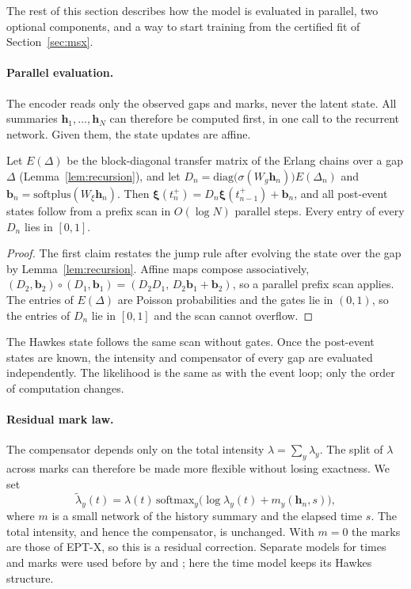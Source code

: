 The rest of this section describes how the model is evaluated in parallel, two optional
components, and a way to start training from the certified fit of Section~\ref{sec:msx}.

\paragraph{Parallel evaluation.} The encoder reads only the observed gaps and marks, never the
latent state. All summaries $\bm h_1,\dots,\bm h_N$ can therefore be computed first, in one call to
the recurrent network. Given them, the state updates are affine.

\begin{lemma}\label{lem:scan}
Let $E(\Delta)$ be the block-diagonal transfer matrix of the Erlang chains over a gap $\Delta$
(Lemma~\ref{lem:recursion}), and let $D_n=\mathrm{diag}\bigl(\sigma(W_g\bm h_n)\bigr)E(\Delta_n)$ and
$\bm b_n=\mathrm{softplus}(W_\xi\bm h_n)$. Then $\bm\xi(t_n^+)=D_n\bm\xi(t_{n-1}^+)+\bm b_n$, and all
post-event states follow from a prefix scan in $O(\log N)$ parallel steps. Every entry of every
$D_n$ lies in $[0,1]$.
\end{lemma}

\begin{proof}
The first claim restates the jump rule after evolving the state over the gap by Lemma~\ref{lem:recursion}.
Affine maps compose associatively, $(D_2,\bm b_2)\circ(D_1,\bm b_1)=(D_2D_1,\,D_2\bm b_1+\bm b_2)$,
so a parallel prefix scan applies. The entries of $E(\Delta)$ are Poisson probabilities and the gates
lie in $(0,1)$, so the entries of $D_n$ lie in $[0,1]$ and the scan cannot overflow.
\end{proof}

The Hawkes state follows the same scan without gates. Once the post-event states are known, the
intensity and compensator of every gap are evaluated independently. The likelihood is the same as
with the event loop; only the order of computation changes.

\paragraph{Residual mark law.} The compensator depends only on the total intensity
$\lambda=\sum_y\lambda_y$. The split of $\lambda$ across marks can therefore be made more flexible
without losing exactness. We set
\[
\tilde\lambda_y(t)=\lambda(t)\,\mathrm{softmax}_y\bigl(\log\lambda_y(t)+m_y(\bm h_n,s)\bigr),
\]
where $m$ is a small network of the history summary and the elapsed time $s$. The total intensity,
and hence the compensator, is unchanged. With $m=0$ the marks are those of EPT-X, so this is a
residual correction. Separate models for times and marks were used before by
\citet{shchur2020intensity} and \citet{panos2024decomposable}; here the time model keeps its Hawkes
structure.

